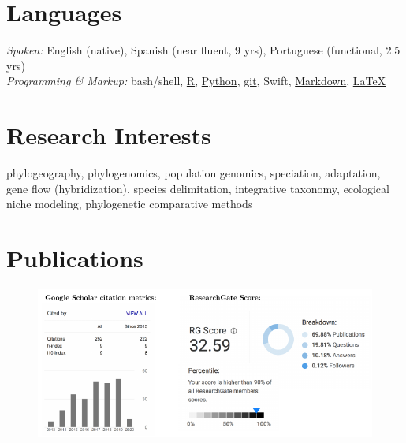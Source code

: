 \documentclass[margin,line]{res}
\begin{document}
\begin{resume}

\section{\sc Languages}
\emph{Spoken:} English (native), Spanish (near fluent, 9 yrs), Portuguese (functional, 2.5 yrs) \\
\emph{Programming \& Markup:} \textsf{bash}/shell, \href{https://cran.r-project.org}{\textsf{R}}, \href{https://www.python.org}{Python}, \href{https://git-scm.com}{\textsf{git}}, Swift, \href{https://www.markdownguide.org}{Markdown}, \href{https://www.latex-project.org}{\LaTeX}



\section{\sc Research Interests}
phylogeography, phylogenomics, population genomics, speciation, adaptation, \\
gene flow (hybridization), species delimitation, integrative taxonomy, ecological \\
niche modeling, phylogenetic comparative methods



\section{\sc Publications}


\begin{figure}[h]
	\includegraphics[scale=1.1]{./metrics_Mar72020.pdf}
\end{figure}


\end{resume}
\end{document}
